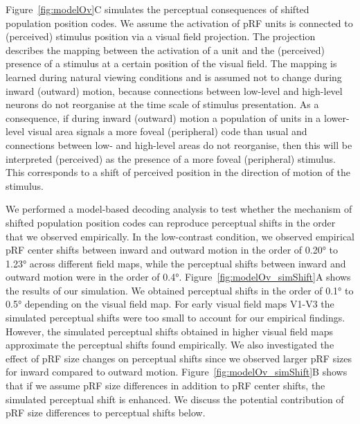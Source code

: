 Figure~\ref{fig:modelOv}C simulates the perceptual consequences of shifted population position codes. We assume the activation of pRF units is connected to (perceived) stimulus position via a visual field projection. The projection describes the mapping between the activation of a unit and the (perceived) presence of a stimulus at a certain position of the visual field. The mapping is learned during natural viewing conditions and is assumed not to change during inward (outward) motion, because connections between low-level and high-level neurons do not reorganise at the time scale of stimulus presentation. As a consequence, if during inward (outward) motion a population of units in a lower-level visual area signals a more foveal (peripheral) code than usual and connections between low- and high-level areas do not reorganise, then this will be interpreted (perceived) as the presence of a more foveal (peripheral) stimulus. This corresponds to a shift of perceived position in the direction of motion of the stimulus.

We performed a model-based decoding analysis to test whether the mechanism of shifted population position codes can reproduce perceptual shifts in the order that we observed empirically. In the low-contrast condition, we observed empirical pRF center shifts between inward and outward motion in the order of 0.20° to 1.23° across different field maps, while the perceptual shifts between inward and outward motion were in the order of 0.4°. Figure~\ref{fig:modelOv_simShift}A shows the results of our simulation. We obtained perceptual shifts in the order of 0.1° to 0.5° depending on the visual field map. For early visual field maps V1-V3 the simulated perceptual shifts were too small to account for our empirical findings. However, the simulated perceptual shifts obtained in higher visual field maps approximate the perceptual shifts found empirically. We also investigated the effect of pRF size changes on perceptual shifts since we observed larger pRF sizes for inward compared to outward motion. Figure~\ref{fig:modelOv_simShift}B shows that if we assume pRF size differences in addition to pRF center shifts, the simulated perceptual shift is enhanced. We discuss the potential contribution of pRF size differences to perceptual shifts below.

